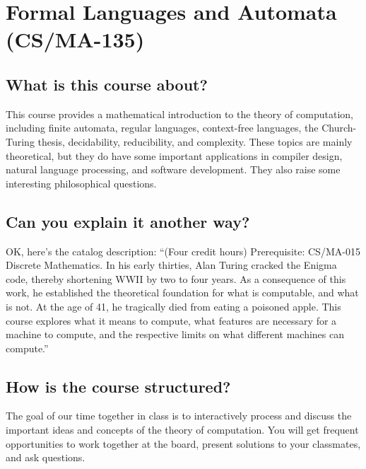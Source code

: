 \documentclass[
  twoside]{article}
\author{}
\date{\vspace{-2.5em}}
\begin{document}
\hypertarget{formal-languages-and-automata-csma-135}{%
\section{Formal Languages and Automata
(CS/MA-135)}\label{formal-languages-and-automata-csma-135}}

\hypertarget{what-is-this-course-about}{%
\subsection{What is this course
about?}\label{what-is-this-course-about}}

This course provides a mathematical introduction to the theory of
computation, including finite automata, regular languages, context-free
languages, the Church-Turing thesis, decidability, reducibility, and
complexity. These topics are mainly theoretical, but they do have some
important applications in compiler design, natural language processing,
and software development. They also raise some interesting philosophical
questions.

\hypertarget{can-you-explain-it-another-way}{%
\subsection{Can you explain it another
way?}\label{can-you-explain-it-another-way}}

OK, here's the catalog description: ``(Four credit hours) Prerequisite:
CS/MA-015 Discrete Mathematics. In his early thirties, Alan Turing
cracked the Enigma code, thereby shortening WWII by two to four years.
As a consequence of this work, he established the theoretical foundation
for what is computable, and what is not. At the age of 41, he tragically
died from eating a poisoned apple. This course explores what it means to
compute, what features are necessary for a machine to compute, and the
respective limits on what different machines can compute.''

\hypertarget{how-is-the-course-structured}{%
\subsection{How is the course
structured?}\label{how-is-the-course-structured}}

The goal of our time together in class is to interactively process and
discuss the important ideas and concepts of the theory of computation.
You will get frequent opportunities to work together at the board,
present solutions to your classmates, and ask questions.
\end{document}
